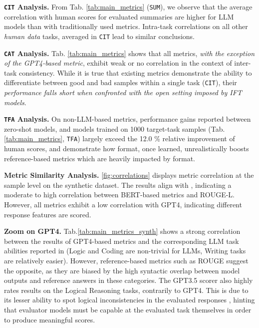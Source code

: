 \noindent\textbf{\texttt{CIT} Analysis.} From Tab. \ref{tab:main_metrics} (\texttt{SUM}), we observe that the average correlation with human scores for evaluated summaries are higher for LLM models than with traditionally used metrics. Intra-task correlations on all other \emph{human data} tasks, averaged in \texttt{CIT} lead to similar conclusions. 


\noindent\textbf{\texttt{CAT} Analysis.} Tab. \ref{tab:main_metrics} shows that all metrics, \emph{with the exception of the GPT4-based metric}, exhibit weak or no correlation in the context of inter-task consistency. While it is true that existing metrics demonstrate the ability to differentiate between good and bad samples within a single task (\texttt{CIT}), their \emph{performance falls short when confronted with the open setting imposed by IFT models}.


\noindent\textbf{\texttt{TFA} Analysis.} On non-LLM-based metrics, performance gains reported between zero-shot models, and models trained on 1000 target-task samples (Tab. \ref{tab:main_metrics}, \texttt{TFA}) largely exceed the  12.0 \% relative improvement of human scores, and demonstrate how format, once learned, unrealistically boosts reference-based metrics which are heavily impacted by format.

\noindent\textbf{Metric Similarity Analysis.} \autoref{fig:correlations} displays metric correlation at the sample level on the synthetic dataset. The results align with , indicating a moderate to high correlation between BERT-based metrics and ROUGE-L. However, all metrics exhibit a low correlation with GPT4, indicating different response features are scored. 

\noindent\textbf{Zoom on GPT4.} Tab.\ref{tab:main_metrics_synth} shows a strong correlation between the results of GPT4-based metrics and the corresponding LLM task abilities reported in  (Logic and Coding are non-trivial for LLMs, Writing tasks are relatively easier). However, reference-based metrics such as ROUGE suggest the opposite, as they are biased by the high syntactic overlap between model outputs and reference answers in these categories. The GPT3.5 scorer also highly rates results on the Logical Reasoning tasks, contrarily to GPT4. This is due to its lesser ability to spot logical inconsistencies in the evaluated responses , hinting that evaluator models must be capable at the evaluated task themselves in order to produce meaningful scores.

